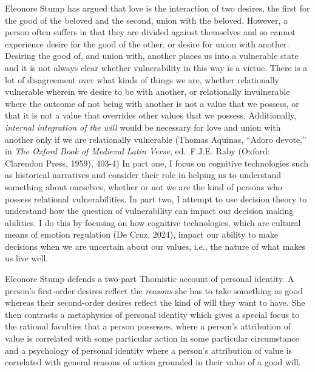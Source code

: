 \documentclass[
  letterpaper,
  DIV=11,
  numbers=noendperiod]{scrartcl}
\begin{document}
Eleonore Stump has argued that love is the interaction of two desires,
the first for the good of the beloved and the second, union with the
beloved. However, a person often suffers in that they are divided
against themselves and so cannot experience desire for the good of the
other, or desire for union with another. Desiring the good of, and union
with, another places us into a vulnerable state and it is not always
clear whether vulnerability in this way is a virtue. There is a lot of
disagreement over what kinds of things we are, whether relationally
vulnerable wherein we desire to be with another, or relationally
invulnerable where the outcome of not being with another is not a value
that we possess, or that it is not a value that overrides other values
that we possess. Additionally, \emph{internal integration of the will}
would be necessary for love and union with another only if we are
relationally vulnerable (Thomas Aquinas, ``Adoro devote,'' in \emph{The
Oxford Book of Medieval Latin Verse,} ed.~F.J.E. Raby (Oxford: Clarendon
Press, 1959), 403-4) In part one, I focus on cognitive technologies such
as historical narratives and consider their role in helping us to
understand something about ourselves, whether or not we are the kind of
persons who possess relational vulnerabilities. In part two, I attempt
to use decision theory to understand how the question of vulnerability
can impact our decision making abilities. I do this by focusing on how
cognitive technologies, which are cultural means of emotion regulation
(De Cruz, 2024), impact our ability to make decisions when we are
uncertain about our values, i.e., the nature of what makes us live well.

Eleonore Stump defends a two-part Thomistic account of personal
identity. A person's first-order desires reflect the \emph{reasons} she
has to take something as good whereas their second-order desires reflect
the kind of will they want to have. She then contrasts a metaphysics of
personal identity which gives a special focus to the rational faculties
that a person possesses, where a person's attribution of value is
correlated with some particular action in some particular circumstance
and a psychology of personal identity where a person's attribution of
value is correlated with general reasons of action grounded in their
value of a good will.
\end{document}
